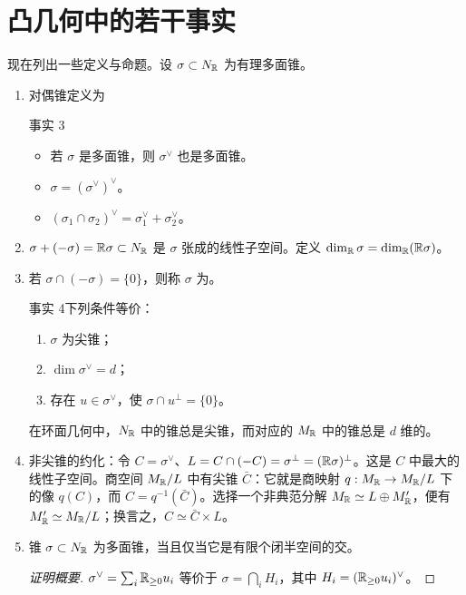 \section{凸几何中的若干事实}
现在列出一些定义与命题。设 $\sigma\subset N_{\mathbb R}$ 为有理多面锥。
\begin{enumerate}[label=(\alph*)]
\item 对偶锥定义为
\begin{custom}{事实 3}\hypertarget{fact:3}{}\begin{itemize}
\item 若 $\sigma$ 是多面锥，则 $\sigma^\vee$ 也是多面锥。
\item $\sigma=(\sigma^\vee)^\vee$。
\item $(\sigma_1\cap\sigma_2)^\vee=\sigma_1^\vee+\sigma_2^\vee$。
\end{itemize}\end{custom}
\item $\sigma+(-\sigma)=\mathbb R\sigma\subset N_{\mathbb R}$ 是 $\sigma$ 张成的线性子空间。定义 $\dim_{\mathbb R}\sigma=\dim_{\mathbb R}(\mathbb R\sigma)$。
\item 若 $\sigma\cap(-\sigma)=\{0\}$，则称 $\sigma$ 为。
\begin{custom}{事实 4}\hypertarget{fact:4}{}下列条件等价：
\begin{enumerate}[label=(\roman*)]
\item $\sigma$ 为尖锥；\item $\dim\sigma^\vee=d$；\item 存在 $u\in\sigma^\vee$，使 $\sigma\cap u^\perp=\{0\}$。
\end{enumerate}\end{custom}
在环面几何中，$N_{\mathbb R}$ 中的锥总是尖锥，而对应的 $M_{\mathbb R}$ 中的锥总是 $d$ 维的。
\item 非尖锥的约化：令 $C=\sigma^\vee$、$L=C\cap(-C)=\sigma^\perp=(\mathbb R\sigma)^\perp$。这是 $C$ 中最大的线性子空间。商空间 $M_{\mathbb R}/L$ 中有尖锥 $\bar C$：它就是商映射 $q:M_{\mathbb R}\to M_{\mathbb R}/L$ 下的像 $q(C)$，而 $C=q^{-1}(\bar C)$。选择一个非典范分解 $M_{\mathbb R}\simeq L\oplus M'_{\mathbb R}$，便有 $M'_{\mathbb R}\simeq M_{\mathbb R}/L$；换言之，$C\simeq\bar C\times L$。
\item 锥 $\sigma\subset N_{\mathbb R}$ 为多面锥，当且仅当它是有限个闭半空间的交。
\begin{proof}[证明概要]$\sigma^\vee=\sum_i\mathbb R_{\ge0}u_i$ 等价于 $\sigma=\bigcap_iH_i$，其中 $H_i=(\mathbb R_{\ge0}u_i)^\vee$。\end{proof}

\end{enumerate}
